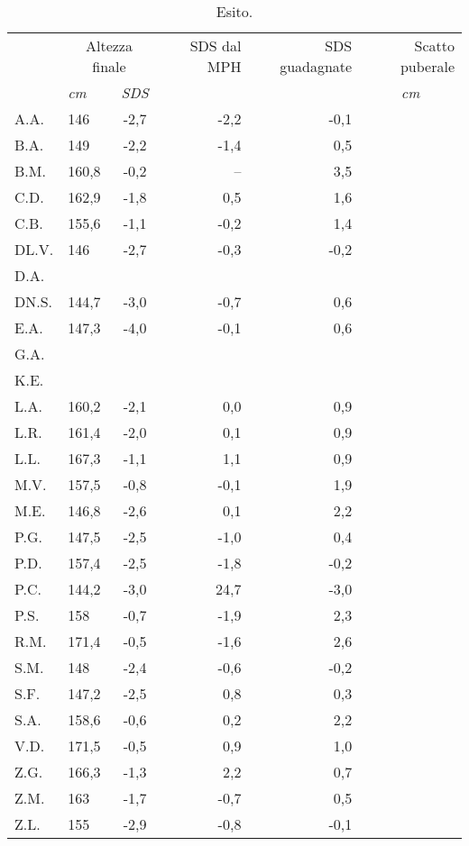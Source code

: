 \begin{table}[!h]
\begin{center}
\begin{tabular}{llcrrr}
\toprule
 & \multicolumn{2}{c}{Altezza finale} 	& SDS dal MPH	& SDS guadagnate & Scatto puberale \\
\cmidrule(r){2-3}
  & \emph{cm} 	& \emph{SDS}  	   	&		& 			 & \multicolumn{1}{c}{\emph{cm}}	\\
\midrule
A.A.	& 146   & -2,7  & -2,2  & -0,1  &   \\
B.A.	& 149   & -2,2  & -1,4  & 0,5   &   \\
B.M.	& 160,8 & -0,2  & --    & 3,5   &   \\
C.D.	& 162,9 & -1,8  & 0,5   & 1,6   &   \\
C.B.	& 155,6 & -1,1  & -0,2  & 1,4   &   \\
DL.V.	& 146   & -2,7  & -0,3  & -0,2  &   \\
D.A.	&       &       &       &       &   \\
DN.S.	& 144,7 & -3,0  & -0,7  & 0,6   &   \\
E.A.	& 147,3 & -4,0  & -0,1  & 0,6   &   \\
G.A.	&       &       &       &       &   \\
K.E.	&       &       &       &       &   \\
L.A.	& 160,2 & -2,1  & 0,0   & 0,9   &   \\
L.R.	& 161,4 & -2,0  & 0,1   & 0,9   &   \\
L.L.	& 167,3 & -1,1  & 1,1   & 0,9   &   \\
M.V.	& 157,5 & -0,8  & -0,1  & 1,9   &   \\
M.E.	& 146,8 & -2,6  & 0,1   & 2,2   &   \\
P.G.	& 147,5 & -2,5  & -1,0  & 0,4   &   \\
P.D.	& 157,4 & -2,5  & -1,8  & -0,2  &   \\
P.C.	& 144,2 & -3,0  & 24,7  & -3,0  &   \\
P.S.	& 158   & -0,7  & -1,9  & 2,3   &   \\
R.M.	& 171,4 & -0,5  & -1,6  & 2,6   &   \\
S.M.	& 148   & -2,4  & -0,6  & -0,2  &   \\
S.F.	& 147,2 & -2,5  & 0,8   & 0,3   &   \\
S.A.	& 158,6 & -0,6  & 0,2   & 2,2   &   \\
V.D.	& 171,5 & -0,5  & 0,9   & 1,0   &   \\
Z.G.	& 166,3 & -1,3  & 2,2   & 0,7   &   \\
Z.M.	& 163   & -1,7  & -0,7  & 0,5   &   \\
Z.L.	& 155   & -2,9  & -0,8  & -0,1  &   \\
\bottomrule
\end{tabular}
\end{center}
\caption{Esito.}
\label{tab:Esito}
\end{table}

